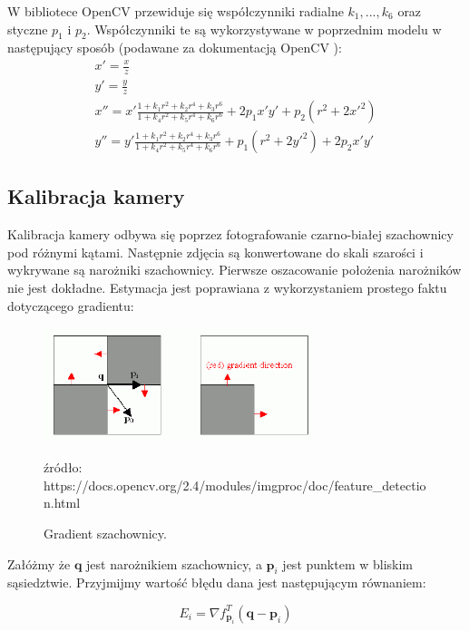 \documentclass[oneside, eng]{mgr}
\newcommand{\bb}{\textbf}
\begin{document}
W bibliotece OpenCV przewiduje się współczynniki radialne $k_1, ..., k_6$ oraz styczne $p_1$ i $p_2$. Współczynniki te są wykorzystywane w poprzednim modelu w następujący sposób (podawane za dokumentacją OpenCV \cite{Dokumentacja OpenCV}):
\begin{gather*}
	x' = \frac{x}{z} \\
	y' = \frac{y}{z} \\
	x'' = x' \frac{1+k_1 r^2 + k_2 r^4 + k_3 r^6}{1+k_4 r^2+k_5 r^4+k_6 r^6} +
	2 p_1 x' y' + p_2(r^2 + 2 x'^2)	\\
	y'' = y' \frac{1+k_1 r^2 + k_2 r^4 + k_3 r^6}{1+k_4 r^2+k_5 r^4+k_6 r^6} +
	p_1(r^2 + 2 y'^2) + 2 p_2 x' y'
\end{gather*}


\subsection{Kalibracja kamery}

Kalibracja kamery odbywa się poprzez fotografowanie czarno-białej szachownicy pod różnymi kątami. Następnie zdjęcia są konwertowane do skali szarości i wykrywane są narożniki szachownicy. Pierwsze oszacowanie położenia narożników nie jest dokładne. Estymacja jest poprawiana z wykorzystaniem prostego faktu dotyczącego gradientu:

\begin{figure}
\centering
	\includegraphics[width=0.70\textwidth]{cornersubpix.png}\par\vspace{1cm}
\caption{Gradient szachownicy.}
źródło: https://docs.opencv.org/2.4/modules/imgproc/doc/feature\_detection.html
	\label{fig:gradient}
\end{figure}

Załóżmy że $\bb{q}$ jest narożnikiem szachownicy, a $\bb{p}_i$ jest punktem w bliskim sąsiedztwie. Przyjmijmy wartość błędu dana jest następującym równaniem:

\begin{equation}
	E_i = \nabla f_{\bb{p}_i}^T (\bb{q} - \bb{p}_i)
\end{equation}
\end{document}
